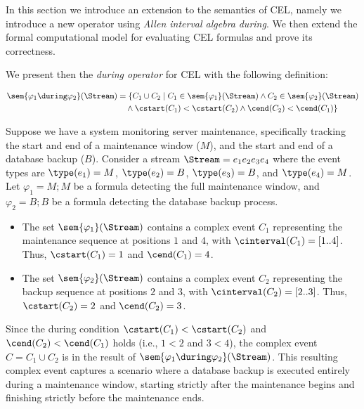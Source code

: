 In this section we introduce an extension to the semantics of CEL, namely we introduce a new operator using \textit{Allen interval algebra} \textit{during}.
We then extend the formal computational model for evaluating CEL formulas and prove its correctness.

We present then the \emph{during operator} for CEL with the following definition:


$$\begin{aligned} 	\sem{\varphi_1 \during \varphi_2}(\Stream) 	&= \{C_1 \cup C_2 \mid C_1 \in \sem{\varphi_1}(\Stream)  	\land C_2 \in \sem{\varphi_2}(\Stream) \\ 	&\quad \land \cstart(C_1) < \cstart(C_2) \land \cend(C_2) < \cend(C_1)\} \end{aligned}$$

\begin{example} Suppose we have a system monitoring server maintenance, specifically tracking the start and end of a maintenance window ($M$), and the start and end of a database backup ($B$). Consider a stream $\Stream = e_1 e_2 e_3 e_4$ where the event types are $\type(e_1) = M$, $\type(e_2) = B$, $\type(e_3) = B$, and $\type(e_4) = M$.
Let $\varphi_1 = M ; M$ be a formula detecting the full maintenance window, and $\varphi_2 = B ; B$ be a formula detecting the database backup process.
\begin{itemize}
	\item The set $\sem{\varphi_1}(\Stream)$ contains a complex event $C_1$ representing the maintenance sequence at positions $1$ and $4$, with $\cinterval(C_1) = [1..4]$. Thus, $\cstart(C_1) = 1$ and $\cend(C_1) = 4$.
	\item The set $\sem{\varphi_2}(\Stream)$ contains a complex event $C_2$ representing the backup sequence at positions $2$ and $3$, with $\cinterval(C_2) = [2..3]$. Thus, $\cstart(C_2) = 2$ and $\cend(C_2) = 3$.
\end{itemize}

Since the during condition $\cstart(C_1) < \cstart(C_2)$ and $\cend(C_2) < \cend(C_1)$ holds (i.e., $1 < 2$ and $3 < 4$), the complex event $C = C_1 \cup C_2$ is in the result of $\sem{\varphi_1 \during \varphi_2}(\Stream)$. This resulting complex event captures a scenario where a database backup is executed entirely during a maintenance window, starting strictly after the maintenance begins and finishing strictly before the maintenance ends.

\end{example}

